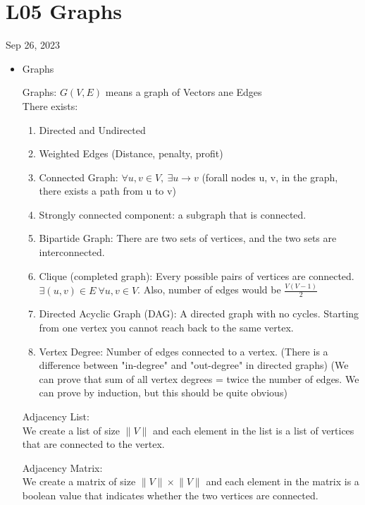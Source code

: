 \section{L05 Graphs}
Sep 26, 2023
\begin{itemize}
	\item Graphs
		\begin{definition}
			Graphs: $G(V, E)$ means a graph of Vectors ane Edges\\
			There exists:
			 \begin{enumerate}
				 \item Directed and Undirected
				 \item Weighted Edges (Distance, penalty, profit)
				 \item Connected Graph: $\forall u, v \in V,~ \exists u \to v$ (forall nodes u, v, in the graph, there exists a path from u to v)
				 \item Strongly connected component: a subgraph that is connected.
				 \item Bipartide Graph: There are two sets of vertices, and the two sets are interconnected.
				 \item Clique (completed graph): Every possible pairs of vertices are connected. $\exists \left( u, v \right) \in E~\forall u,v \in V$. Also, number of edges would be $\frac{V(V-1)}{2}$
				 \item Directed Acyclic Graph (DAG): A directed graph with no cycles. Starting from one vertex you cannot reach back to the same vertex.
				 \item Vertex Degree: Number of edges connected to a vertex. (There is a difference between "in-degree" and "out-degree" in directed graphs) (We can prove that sum of all vertex degrees = twice the number of edges. We can prove by induction, but this should be quite obvious)
			\end{enumerate}
		\end{definition}
		\begin{definition}
			Adjacency List:\\
			We create a list of size $\lVert V \rVert $ and each element in the list is a list of vertices that are connected to the vertex.\\
		\end{definition}
		\begin{definition}
			Adjacency Matrix:\\
			We create a matrix of size $\lVert V \rVert \times \lVert V \rVert$ and each element in the matrix is a boolean value that indicates whether the two vertices are connected.\\

\end{definition}
\end{itemize}

